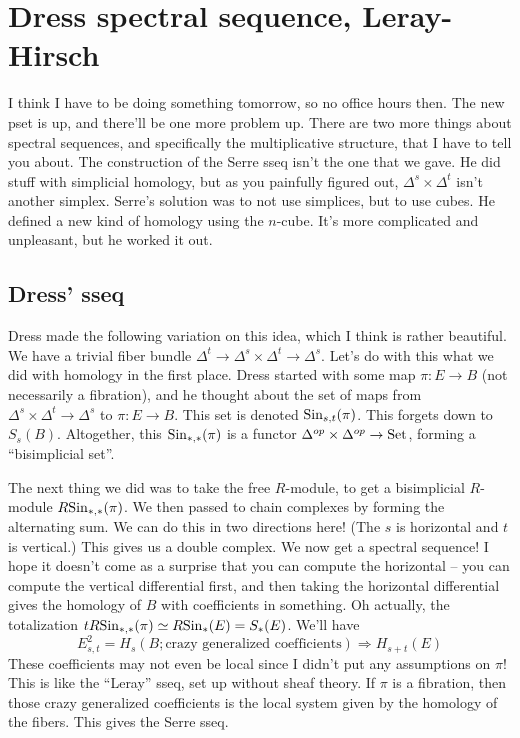 \section{Dress spectral sequence, Leray-Hirsch}
I think I have to be doing something tomorrow, so no office hours then.
The new pset is up, and there'll be one more problem up.
There are two more things about spectral sequences, and specifically the multiplicative structure, that I have to tell you about.
The construction of the Serre sseq isn't the one that we gave.
He did stuff with simplicial homology, but as you painfully figured out, $\Delta^s\times\Delta^t$ isn't another simplex.
Serre's solution was to not use simplices, but to use cubes.
He defined a new kind of homology using the $n$-cube.
It's more complicated and unpleasant, but he worked it out.
\subsection{Dress' sseq}
Dress made the following variation on this idea, which I think is rather beautiful.
We have a trivial fiber bundle $\Delta^t \to \Delta^s\times\Delta^t\to \Delta^s$.
Let's do with this what we did with homology in the first place.
Dress started with some map $\pi:E\to B$ (not necessarily a fibration), and he thought about the set of maps from $\Delta^s\times\Delta^t\to \Delta^s$ to $\pi:E\to B$.
This set is denoted $\mathrm{Sin}_{s,t}(\pi)$.
This forgets down to $S_s(B)$.
Altogether, this $\mathrm{Sin}_{\ast,\ast}(\pi)$ is a functor ${\Delta}^{op}\times{\Delta}^{op}\to {\mathrm{Set}}$, forming a ``bisimplicial set''.

The next thing we did was to take the free $R$-module, to get a bisimplicial $R$-module $R\mathrm{Sin}_{\ast,\ast}(\pi)$.
We then passed to chain complexes by forming the alternating sum.
We can do this in two directions here!
(The $s$ is horizontal and $t$ is vertical.)
This gives us a double complex.
We now get a spectral sequence!
I hope it doesn't come as a surprise that you can compute the horizontal -- you can compute the vertical differential first, and then taking the horizontal differential gives the homology of $B$ with coefficients in something.
Oh actually, the totalization $tR\mathrm{Sin}_{\ast,\ast}(\pi) \simeq R\mathrm{Sin}_\ast(E) = S_\ast(E)$.
We'll have
$$
E^2_{s,t} = H_s(B;\text{crazy generalized coefficients}) \Rightarrow H_{s+t}(E)
$$
These coefficients may not even be local since I didn't put any assumptions on $\pi$!
This is like the ``Leray'' sseq, set up without sheaf theory.
If $\pi$ is a fibration, then those crazy generalized coefficients is the local system given by the homology of the fibers.
This gives the Serre sseq.

